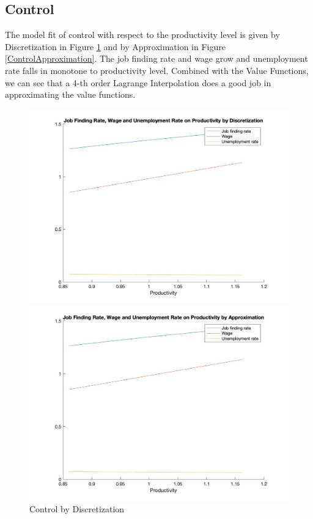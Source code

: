 \documentclass[10pt]{article} %
\begin{document}
        \subsection{Control}
        The model fit of control with respect to the productivity level is given by Discretization in Figure \ref{ControlDiscretization} and by Approximation in Figure \ref{ControlApproximation}. The job finding rate and wage grow and unemployment rate falls in monotone to productivity level. Combined with the Value Functions, we can see that a 4-th order Lagrange Interpolation does a good job in approximating the value functions.
        
        \begin{figure}
            \centering
            \begin{minipage}{.5\textwidth}
                \centering
                \includegraphics[width=\linewidth]{ControlDiscretization}
                \caption{Control by Discretization}
                \label{ControlDiscretization}
            \end{minipage}%
            \begin{minipage}{.5\textwidth}
                \centering
                \includegraphics[width=\linewidth]{ControlApproximation}

\end{minipage}
\end{figure}
\end{document}
